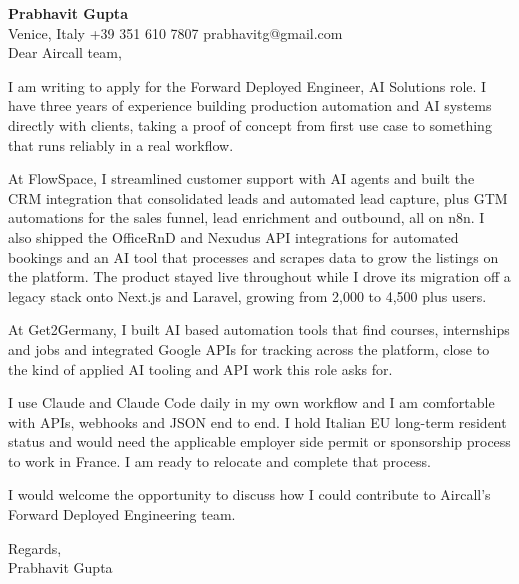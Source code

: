 \documentclass[a4paper,10.5pt]{article}
\begin{document}
\textbf{Prabhavit Gupta}\\
Venice, Italy \textbar{} +39 351 610 7807 \textbar{} prabhavitg@gmail.com\\[10pt]
Dear Aircall team,

I am writing to apply for the Forward Deployed Engineer, AI Solutions role. I have three years of experience building production automation and AI systems directly with clients, taking a proof of concept from first use case to something that runs reliably in a real workflow.

At FlowSpace, I streamlined customer support with AI agents and built the CRM integration that consolidated leads and automated lead capture, plus GTM automations for the sales funnel, lead enrichment and outbound, all on n8n. I also shipped the OfficeRnD and Nexudus API integrations for automated bookings and an AI tool that processes and scrapes data to grow the listings on the platform. The product stayed live throughout while I drove its migration off a legacy stack onto Next.js and Laravel, growing from 2,000 to 4,500 plus users.

At Get2Germany, I built AI based automation tools that find courses, internships and jobs and integrated Google APIs for tracking across the platform, close to the kind of applied AI tooling and API work this role asks for.

I use Claude and Claude Code daily in my own workflow and I am comfortable with APIs, webhooks and JSON end to end. I hold Italian EU long-term resident status and would need the applicable employer side permit or sponsorship process to work in France. I am ready to relocate and complete that process.

I would welcome the opportunity to discuss how I could contribute to Aircall's Forward Deployed Engineering team.

Regards,\\
Prabhavit Gupta
\end{document}
